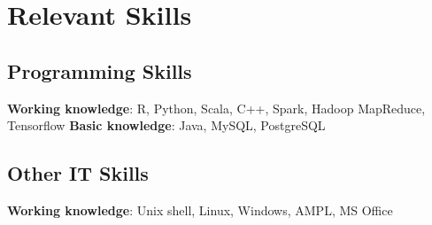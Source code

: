 \documentclass[11pt,a4paper,roman]{moderncv}   %
\begin{document}
{{{%


\section{Relevant Skills}

\vspace{0.2cm}



\subsection{Programming Skills}
\textbf{Working knowledge}: R, Python, Scala, C++, Spark, Hadoop MapReduce, Tensorflow
\hspace{20cm} \linebreak
\textbf{Basic knowledge}: Java, MySQL, PostgreSQL 

\vspace{0.1cm}
\subsection{Other IT Skills}
\textbf{Working knowledge}: Unix shell, Linux, Windows, AMPL, MS Office


}}}
\end{document}
